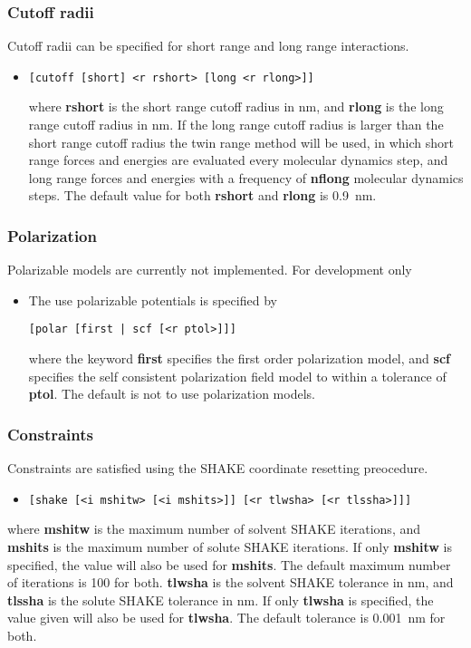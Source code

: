\subsubsection{Cutoff radii}
Cutoff radii can be specified for short range and long range interactions.
\begin{itemize}
\item
\begin{verbatim}
[cutoff [short] <r rshort> [long <r rlong>]]
\end{verbatim}
where {\bf rshort} is the short range cutoff radius in nm, and {\bf rlong}
is the long range cutoff radius in nm. If the long range cutoff radius
is larger than the short range cutoff radius the twin range method will
be used, in which short range forces and energies are evaluated every
molecular dynamics step, and long range forces and energies with a
frequency of {\bf nflong} molecular dynamics steps. The default value
for both {\bf rshort} and {\bf rlong} is 0.9~nm.
\end{itemize}
\subsubsection{Polarization}
Polarizable models are currently not implemented. For development only
\begin{itemize}
\item
The use polarizable potentials is specified by
\begin{verbatim}
[polar [first | scf [<r ptol>]]]
\end{verbatim}
where the keyword {\bf first} specifies the first order polarization
model, and {\bf scf} specifies the self consistent polarization field
model to within a tolerance of {\bf ptol}. The default is not to
use polarization models.
\end{itemize}
\subsubsection{Constraints}
Constraints are satisfied using the SHAKE coordinate resetting preocedure.
\begin{itemize}
\item
\begin{verbatim}
[shake [<i mshitw> [<i mshits>]] [<r tlwsha> [<r tlssha>]]]
\end{verbatim}
\end{itemize}
where {\bf mshitw} is the maximum number of solvent SHAKE iterations,
and {\bf mshits} is the maximum number of solute SHAKE iterations. If
only {\bf mshitw} is specified, the value will also be used for {\bf mshits}.
The default maximum number of iterations is 100 for both.
{\bf tlwsha} is the solvent SHAKE tolerance in nm, and {\bf tlssha} is
the solute SHAKE tolerance in nm. If only {\bf tlwsha} is specified, the
value given will also be used for {\bf tlwsha}. The default tolerance
is 0.001~nm for both.

